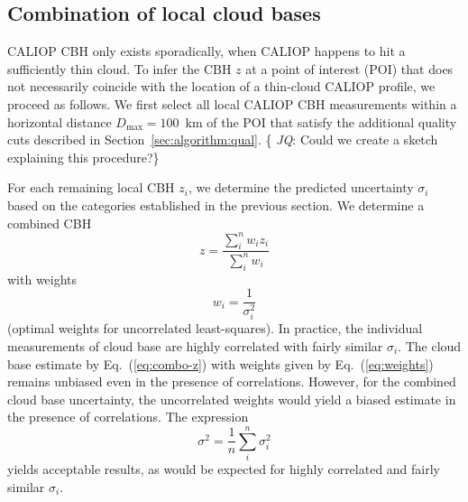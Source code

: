 \documentclass[essd,manuscript]{copernicus}\usepackage[]{graphicx}\usepackage[]{color}
\newcommand{\hlnum}[1]{\textcolor[rgb]{0.686,0.059,0.569}{#1}}%
\newcommand\comment[2]{\{\hlnum{ \textit{#1}: #2}\}}
\newcommand\commentjm[1]{\comment{$j_\mu$}{#1}}
\begin{document}
\subsection{Combination of local cloud bases}
\label{sec:algorithm:combination}
CALIOP CBH only exists sporadically, %
when CALIOP happens to hit a sufficiently thin cloud.  To infer the CBH $z$ at a
point of interest (POI) that does not necessarily coincide with the location of
a thin-cloud CALIOP profile, we proceed as follows.  We first select all local
CALIOP CBH measurements within a horizontal distance $D_\text{max} = 100$~km of
the POI that satisfy the additional quality cuts described in
Section~\ref{sec:algorithm:qual}. \comment{JQ}{Could we create a sketch
  explaining this procedure?}

For each remaining local CBH $z_i$, we determine the predicted
uncertainty $\sigma_i$ based on the categories established in the previous
section.  We determine a combined CBH
\begin{equation}
  \label{eq:combo-z}
  z = \frac{\sum\limits_i^n w_i z_i}{\sum\limits_i^n w_i}
\end{equation}
with weights
\begin{equation}
  \label{eq:weights}
  w_i = \frac 1 {\sigma_i^2}
\end{equation}
(optimal weights for uncorrelated least-squares).  In practice, the individual
measurements of cloud base are highly correlated with fairly similar
$\sigma_i$.  The cloud base estimate by Eq.~(\ref{eq:combo-z}) with weights
given by Eq.~(\ref{eq:weights}) remains unbiased even in the presence of
correlations.  However, for the combined cloud base uncertainty,
the uncorrelated weights would yield a biased estimate in the presence of
correlations.  The expression
\begin{equation}
  \label{eq:combo-sigma}
  \sigma^2 = \frac 1 n \sum\limits_i^n \sigma_i^2
\end{equation}
yields acceptable results, as would be expected for highly correlated and fairly
similar $\sigma_i$.  

\end{document}
